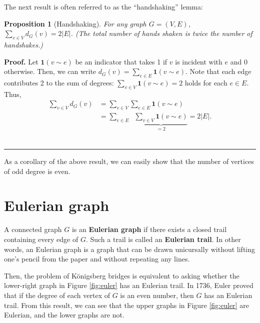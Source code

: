 \documentclass[10.5pt, A4paper, openany, uplatex]{book}
\newtheorem{proposition}[theorem]{Proposition}
{\theorembodyfont{\upshape}
\newtheorem{remark}{Remark}
}
\newenvironment{proof}[1][Proof]{\textbf{#1.} }{\  \rule{0.5em}{0.5em}}
\numberwithin{equation}{section}
\begin{document}
\begin{appendices}
	The next result is often referred to as the ``handshaking'' lemma:
	\begin{proposition}[Handshaking]\label{prop:handshake}
		For any graph $G = (V, E)$, $\sum_{v \in V} d_G(v) = 2 | E |$.
		(The total number of hands shaken is twice the number of handshakes.)
	\end{proposition}
	
	\begin{proof}
		Let $\mathbf{1}(v \sim e)$ be an indicator that takes 1 if $v$ is incident with $e$ and 0 otherwise.
		Then, we can write $d_G(v) = \sum_{e \in E}\mathbf{1}(v \sim e)$.
		Note that each edge contributes 2 to the sum of degrees: $\sum_{v \in V}\mathbf{1}(v \sim e) = 2$ holds for each $e \in E$.
		Thus,
		\begin{align*}
			\sum_{v \in V} d_G(v) 
			& = \sum_{v \in V} \sum_{e \in E}\mathbf{1}(v \sim e) \\
			& = \sum_{e \in E} \;\; \underbrace{\sum_{v \in V} \mathbf{1}(v \sim e)}_{=2} = 2 |E|.
		\end{align*}
	\end{proof}
	
	As a corollary of the above result, we can easily show that the number of vertices of odd degree is even.
	
	\section{Eulerian graph}
	
	A connected graph $G$ is an \textbf{Eulerian graph} if there exists a closed trail containing every edge of $G$.
	Such a trail is called an \textbf{Eulerian trail}.
	In other words, an Eulerian graph is a graph that can be drawn unicursally without lifting one's pencil from the paper and without repeating any lines.
	
	Then, the problem of K\"onigsberg bridges is equivalent to asking whether the lower-right graph in Figure \ref{fig:euler} has an Eulerian trail.
	In 1736, Euler proved that if the degree of each vertex of $G$ is an even number, then $G$ has an Eulerian trail.
	From this result, we can see that the upper graphs in Figure \ref{fig:euler} are Eulerian, and the lower graphs are not.
	

\end{appendices}
\end{document}
